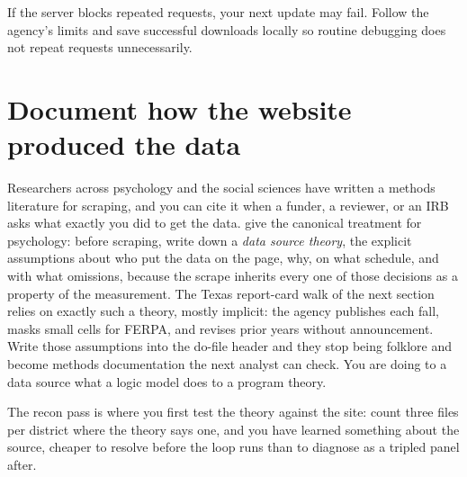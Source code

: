 \documentclass[
    a4paper,
    fontsize=10pt,
    twoside=true,
    numbers=noenddot,
]{kaobook}
\begin{document}
If the server blocks repeated requests, your next update may fail. Follow the agency's limits and save successful downloads locally so routine debugging does not repeat requests unnecessarily.

\section{Document how the website produced the data}\label{sec:ch04-scrapelit}
Researchers across psychology and the social sciences have written a methods literature for scraping, and you can cite it when a funder, a reviewer, or an IRB asks what exactly you did to get the data. \textcite{landers2016scraping} give the canonical treatment for psychology: before scraping, write down a \emph{data source theory}, the explicit assumptions about who put the data on the page, why, on what schedule, and with what omissions, because the scrape inherits every one of those decisions as a property of the measurement. The Texas report-card walk of the next section relies on exactly such a theory, mostly implicit: the agency publishes each fall, masks small cells for FERPA, and revises prior years without announcement. Write those assumptions into the do-file header and they stop being folklore and become methods documentation the next analyst can check. You are doing to a data source what a logic model does to a program theory.

The recon pass is where you first test the theory against the site: count three files per district where the theory says one, and you have learned something about the source, cheaper to resolve before the loop runs than to diagnose as a tripled panel after.
\end{document}

